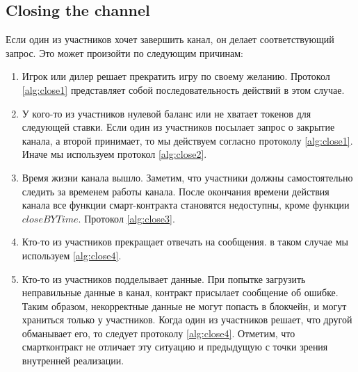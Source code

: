 		\subsection {Closing the channel}
Если один из участников хочет завершить канал, он делает соответствующий запрос. Это может произойти по следующим причинам: \label{closing}
\begin{enumerate}
	\item Игрок или дилер решает прекратить игру по своему желанию. Протокол \autoref{alg:close1} представляет собой последовательность действий в этом случае.
	\item У кого-то из участников нулевой баланс или не хватает токенов для следующей ставки. Если один из участников посылает запрос о закрытие канала, а второй принимает, то мы действуем согласно протоколу \autoref{alg:close1}. Иначе мы используем протокол \autoref{alg:close2}.
	\item Время жизни канала вышло. Заметим, что участники должны самостоятельно следить за временем работы канала. После окончания времени действия канала все функции смарт-контракта становятся недоступны, кроме функции $closeBYTime$. Протокол \autoref{alg:close3}.
	\item Кто-то из участников прекращает отвечать на сообщения. в таком случае мы используем \autoref{alg:close4}.
	\item  Кто-то из участников подделывает данные. При попытке загрузить неправильные данные в канал, контракт присылает сообщение об ошибке. 
Таким образом, некорректные данные не могут попасть в блокчейн, и могут храниться только у участников. Когда один из участников решает, что другой обманывает его, то следует протоколу \autoref{alg:close4}. Отметим, что смартконтракт не отличает эту ситуацию и предыдущую с точки зрения внутренней реализации.
\end{enumerate}
